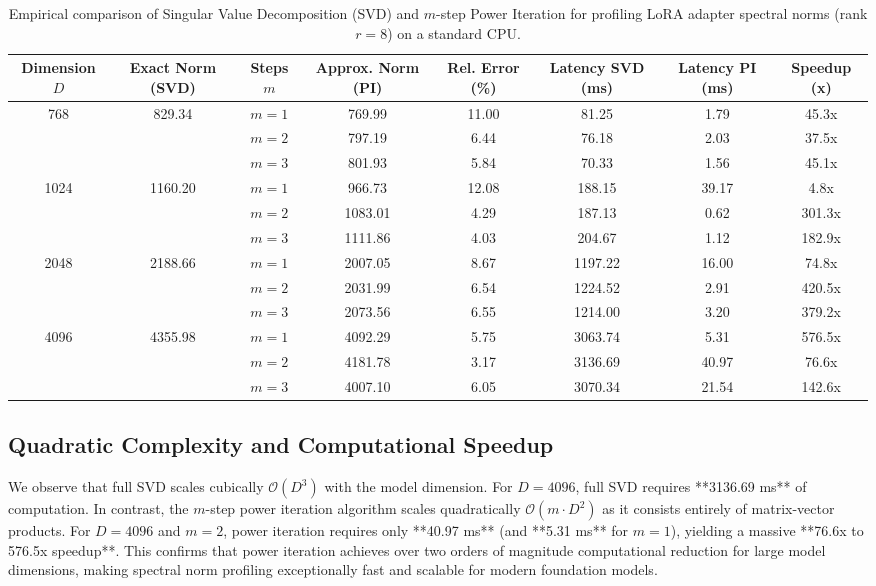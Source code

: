 \documentclass{article}
\theoremstyle{plain}
\theoremstyle{definition}
\theoremstyle{remark}
\begin{document}
\begin{table}[h]
\caption{Empirical comparison of Singular Value Decomposition (SVD) and $m$-step Power Iteration for profiling LoRA adapter spectral norms (rank $r = 8$) on a standard CPU.}
\label{tab:power_iteration_results}
\vskip 0.1in
\begin{center}
\begin{small}
\begin{tabular}{cccccccc}
\toprule
Dimension $D$ & Exact Norm (SVD) & Steps $m$ & Approx. Norm (PI) & Rel. Error (\%) & Latency SVD (ms) & Latency PI (ms) & Speedup (x) \\
\midrule
768  & 829.34 & $m=1$ & 769.99 & 11.00 & 81.25 & 1.79 & 45.3x \\
     &        & $m=2$ & 797.19 & 6.44  & 76.18 & 2.03 & 37.5x \\
     &        & $m=3$ & 801.93 & 5.84  & 70.33 & 1.56 & 45.1x \\
\midrule
1024 & 1160.20 & $m=1$ & 966.73 & 12.08 & 188.15 & 39.17 & 4.8x \\
     &         & $m=2$ & 1083.01 & 4.29  & 187.13 & 0.62  & 301.3x \\
     &         & $m=3$ & 1111.86 & 4.03  & 204.67 & 1.12  & 182.9x \\
\midrule
2048 & 2188.66 & $m=1$ & 2007.05 & 8.67  & 1197.22 & 16.00 & 74.8x \\
     &         & $m=2$ & 2031.99 & 6.54  & 1224.52 & 2.91  & 420.5x \\
     &         & $m=3$ & 2073.56 & 6.55  & 1214.00 & 3.20  & 379.2x \\
\midrule
4096 & 4355.98 & $m=1$ & 4092.29 & 5.75  & 3063.74 & 5.31  & 576.5x \\
     &         & $m=2$ & 4181.78 & 3.17  & 3136.69 & 40.97 & 76.6x \\
     &         & $m=3$ & 4007.10 & 6.05  & 3070.34 & 21.54 & 142.6x \\
\bottomrule
\end{tabular}
\end{small}
\end{center}
\end{table}

\subsection{Quadratic Complexity and Computational Speedup}
We observe that full SVD scales cubically $\mathcal{O}(D^3)$ with the model dimension. For $D = 4096$, full SVD requires **3136.69 ms** of computation. In contrast, the $m$-step power iteration algorithm scales quadratically $\mathcal{O}(m \cdot D^2)$ as it consists entirely of matrix-vector products. For $D = 4096$ and $m = 2$, power iteration requires only **40.97 ms** (and **5.31 ms** for $m=1$), yielding a massive **76.6x to 576.5x speedup**. This confirms that power iteration achieves over two orders of magnitude computational reduction for large model dimensions, making spectral norm profiling exceptionally fast and scalable for modern foundation models.
\end{document}
